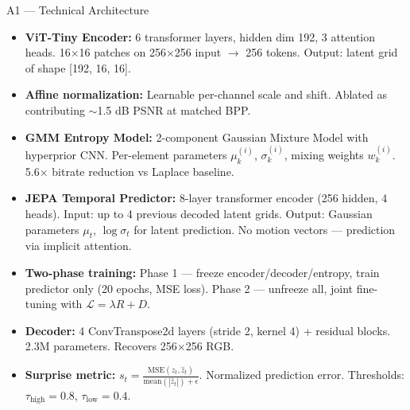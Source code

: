 \documentclass[aspectratio=169, professionalfonts, 10pt]{beamer}
\begin{document}
\appendix
\begin{frame}[allowframebreaks]{A1 --- Technical Architecture}
  \begin{itemize}
    \item \textbf{ViT-Tiny Encoder:} 6 transformer layers, hidden dim 192, 3 attention heads.
          16$\times$16 patches on 256$\times$256 input $\to$ 256 tokens.
          Output: latent grid of shape [192, 16, 16].

    \item \textbf{Affine normalization:} Learnable per-channel scale and shift.
          Ablated as contributing $\sim$1.5 dB PSNR at matched BPP.

    \bigskip
    \item \textbf{GMM Entropy Model:} 2-component Gaussian Mixture Model with hyperprior CNN.
          Per-element parameters $\mu_k^{(i)}$, $\sigma_k^{(i)}$, mixing weights $w_k^{(i)}$.
          5.6$\times$ bitrate reduction vs Laplace baseline.

    \bigskip
    \item \textbf{JEPA Temporal Predictor:} 8-layer transformer encoder (256 hidden, 4 heads).
          Input: up to 4 previous decoded latent grids.
          Output: Gaussian parameters $\mu_t$, $\log\sigma_t$ for latent prediction.
          No motion vectors --- prediction via implicit attention.

    \bigskip
    \item \textbf{Two-phase training:} Phase 1 --- freeze encoder/decoder/entropy,
          train predictor only (20 epochs, MSE loss).
          Phase 2 --- unfreeze all, joint fine-tuning with $\mathcal{L} = \lambda R + D$.

    \bigskip
    \item \textbf{Decoder:} 4 ConvTranspose2d layers (stride 2, kernel 4) +
          residual blocks. 2.3M parameters. Recovers 256$\times$256 RGB.

    \bigskip
    \item \textbf{Surprise metric:}
          $s_t = \frac{\text{MSE}(z_t, \hat{z}_t)}{\text{mean}(|\hat{z}_t|) + \epsilon}$.
          Normalized prediction error. Thresholds: $\tau_{\text{high}} = 0.8$, $\tau_{\text{low}} = 0.4$.
  \end{itemize}
\end{frame}
\end{document}
